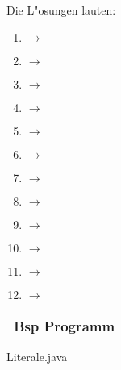 \begin{frame}[fragile]%
  \frametitle{\stitle}%


Die L"osungen lauten:

\begin{center}

\begin{minipage}{0.3\textwidth}
\begin{enumerate}
\item {} $\rightarrow$ \\
\item {}     $\rightarrow$ \\
\item{}       $\rightarrow$ \\
\item {}      $\rightarrow$ \\
\end{enumerate}
\end{minipage}
\hfill
\begin{minipage}{0.3\textwidth}
\begin{enumerate}
\setcounter{enumi}{4}
\item {}   $\rightarrow$ \\
\item {}   $\rightarrow$ \\
\item {}$\rightarrow$ \\
\item {}  $\rightarrow$ \\
\end{enumerate}
\end{minipage}
\hfill
\begin{minipage}{0.3\textwidth}
\begin{enumerate}
\setcounter{enumi}{8}
\item {} $\rightarrow$ \\
\item {} $\rightarrow$ \\
\item {}  $\rightarrow$ \\
\item {}   $\rightarrow$ \\
\end{enumerate}
\end{minipage}

\end{center}
\end{frame}


\begin{frame}[t]%
  \frametitle{\stitle\, Bsp Programm}%


{\getexercisefolder Literale.java}
\end{frame}
